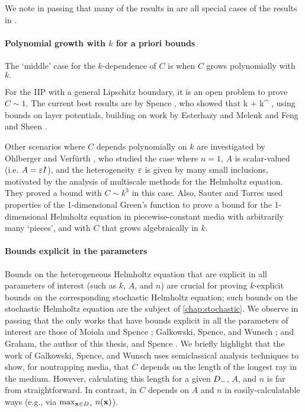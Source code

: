 We note in passing that many of the results in \cite{Mo:61,MoLu:68,Me:95,CuFe:06,BrGaPe:17,BaChGo:17,GrSa:18,MoSp:19} are all special cases of the results in \cite{GrPeSp:19}.


\paragraph{Polynomial growth with $k$ for a priori bounds} The `middle' case for the $k$-dependence of $C$ is when $C$ grows polynomially with $k.$

For the IIP with a general Lipschitz boundary, it is an open problem to prove $C \sim 1.$ The current best results are by Spence \cite{Sp:14}, who showed that
\beqs
{} \lesssim k  + k^{\half} \NLtGI{\gI},
\eeqs
using bounds on layer potentials, building on work by Esterhazy and Melenk \cite{EsMe:12} and Feng and Sheen \cite{FeSh:94}.


Other scenarios where $C$ depends polynomially on $k$ are investigated by Ohlberger and Verf\"urth \cite{OhVe:18}, who studied the case where $n=1$, $A$ is scalar-valued (i.e. $A = \varepsilon I$), and the heterogeneity $\varepsilon$ is given by many small inclusions, motivated by the analysis of multiscale methods for the Helmholtz equation. They proved a bound with $C \sim k^3$ in this case.  Also, Sauter and Torres \cite{SaTo:18} used properties of the 1-dimensional Green's function to prove a bound for the 1-dimensional Helmholtz equation in piecewise-constant media with arbitrarily many `pieces', and with $C$ that grows algebraically in $k$.






\paragraph{Bounds explicit in the parameters} Bounds on the heterogeneous Helmholtz equation that are explicit in all parameters of interest (such as $k$, $A$, and $n$) are crucial for proving $k$-explicit bounds on the corresponding stochastic Helmholtz equation; such bounds on the stochastic Helmholtz equation are the subject of \cref{chap:stochastic}. We observe in passing that the only works that have bounds explicit in all the parameters of interest are those of Moiola and Spence \cite{MoSp:19}; Galkowski, Spence, and Wunsch \cite{GaSpWu:18}; and Graham, the author of this thesis, and Spence \cite{GrPeSp:19}. We briefly highlight that the work of Galkowski, Spence, and Wunsch uses semiclassical analysis techniques to show, for nontrapping media, that $C$ depends on the length of the longest ray in the medium. However, calculating this length for a given $D_{-}$, $A$, and $n$ is far from straightforward. In contrast, in \cite{MoSp:19,GrPeSp:19} $C$ depends on $A$ and $n$ in easily-calculatable ways (e.g., via $\max_{\mathbf{x} \in D_{+}} n(\mathbf{x})$).


